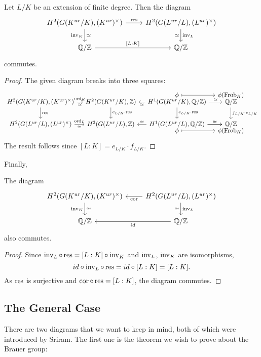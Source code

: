 \documentclass[class=article, crop=false]{standalone}
\begin{document}
\begin{proposition}
	Let $L/K$ be an extension of finite degree. Then the diagram
	\[
	\begin{tikzcd}
		H^{2}(G(K^{ur}/K),(K^{ur})^{\times})\ar{r}{\res}\ar[d,"\inv_K"',"\simeq"] & H^{2}(G(L^{ur}/L),(L^{ur})^{\times})\ar[d,"\inv_L","\simeq"']\\
		\QQ/\ZZ\ar{r}{[L:K]} & \QQ/\ZZ
	\end{tikzcd}
	\] 
	commutes.
\end{proposition}
\begin{proof}
	The given diagram breaks into three squares:
	\[
	\begin{tikzcd}[column sep=1em]
		&&\phi\ar[r,mapsto] & \phi(\Frob_K)\\[-25pt]
		H^2(G(K^{ur}/K),(K^{ur})^{\times})\ar[r,"\ord_K","\simeq"']\ar[d,"\res"] & H^2(G(K^{ur}/K),\ZZ)\ar[d,"e_{L/K}\cdot\res"] & H^{1}(G(K^{ur}/K),\QQ/\ZZ)\ar[l,"\simeq"]\ar[d,"e_{L/K}\cdot\res"]\ar[r,"\simeq"]& \QQ/\ZZ\ar[d,"f_{L/K}\cdot e_{L/K}"]\\
		H^{2}(G(L^{ur}/L),(L^{ur})^{\times})\ar[r,"\ord_L","\simeq"'] & H^2(G(L^{ur}/L),\ZZ) & H^{1}(G(L^{ur}/L),\QQ/\ZZ)\ar[l,"\simeq"']\ar[r,"\simeq"]\ar[r,"\simeq"] & \QQ/\ZZ\\[-25pt]
		&&\phi\ar[r,mapsto] & \phi(\Frob_K)
	\end{tikzcd}
	\] 
	The result follows since $[L:K]=e_{L/K}\cdot f_{L/K}$.
\end{proof}
Finally,
\begin{corollary}
	The diagram
	\[
	\begin{tikzcd}
		H^{2}(G(K^{ur}/K),(K^{ur})^{\times})\ar[d,"\inv_K"',"\simeq"] & H^{2}(G(L^{ur}/L),(L^{ur})^{\times})\ar[l,"\cor"]\ar[d,"\inv_L","\simeq"']\\
		\QQ/\ZZ & \QQ/\ZZ\ar[l,"id"]
	\end{tikzcd}
	\] 
	also commutes.
\end{corollary}
\begin{proof}
	Since $\operatorname{inv}_L\circ\operatorname{res}=[L:K]\circ\operatorname{inv}_K$ and $\operatorname{inv}_L$, $\operatorname{inv}_K$ are isomorphisms,
	\[
		id\circ\operatorname{inv}_L\circ\operatorname{res}=id\circ[L:K]=[L:K]
	.\] 
	As $\operatorname{res}$ is surjective and $\operatorname{cor}\circ\operatorname{res}=[L:K]$, the diagram commutes.
\end{proof}

\subsection{The General Case}

There are two diagrams that we want to keep in mind, both of which were introduced by Sriram. The first one is the theorem we wish to prove about the Brauer group:
\end{document}
